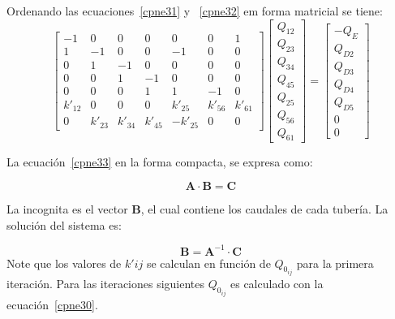 \documentclass[11pt, oneside]{article}
\newcommand{\Q}{\mathbb{Q}}
\begin{document}
\begin{itemize}
Ordenando las ecuaciones~\ref{cpne31} y ~\ref{cpne32} em forma matricial se tiene:
\begin{equation}
\begin{bmatrix}
-1 & 0 & 0 & 0 & 0 & 0 & 1 \\
1 & -1 & 0 & 0 & -1 & 0 & 0 \\
0 & 1 & -1 & 0 & 0 & 0 & 0 \\
0 & 0 & 1 & -1 & 0 & 0 & 0 \\
0 & 0 & 0 & 1 & 1 & -1 & 0 \\
k'_{12} & 0 & 0 & 0 & k'_{25} & k'_{56} & k'_{61} \\
0 & k'_{23} &  k'_{34} & k'_{45} & -k'_{25} & 0 & 0
\end{bmatrix}
\begin{bmatrix}
Q_{12} \\Q_{23} \\Q_{34} \\Q_{45} \\Q_{25} \\Q_{56} \\Q_{61}
\end{bmatrix}
=
\begin{bmatrix}
-Q_{E} \\ Q_{D2} \\Q_{D3} \\Q_{D4} \\Q_{D5} \\ 0 \\ 0
\end{bmatrix}
\label{cpne33}
\end{equation}

\end{itemize}

La ecuaci\'on~\ref{cpne33} en la forma compacta, se expresa como:

\begin{equation}
\mathbf{A}\cdot \mathbf{B} = \mathbf{C}
\label{cpne34}
\end{equation}

La incognita es el vector $\mathbf{B}$, el cual contiene los caudales de cada tuber\'ia. La soluci\'on del sistema es:

\begin{equation}
\mathbf{B} = \mathbf{A}^{-1} \cdot \mathbf{C}
\label{cpne35}
\end{equation}
Note que los valores de $k'{ij}$ se calculan en funci\'on de $Q_{0_{ij}}$ para la primera iteraci\'on. Para las iteraciones siguientes $Q_{0_{ij}}$ es calculado con la ecuaci\'on~\ref{cpne30}.
\end{document}
